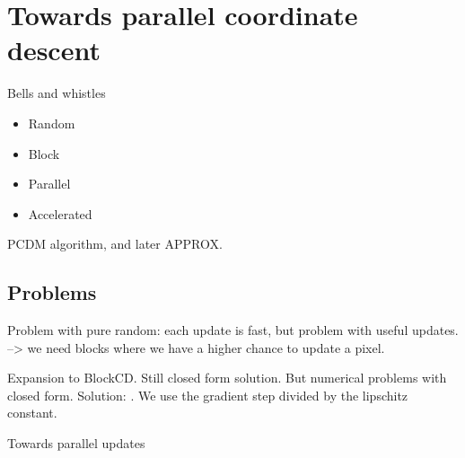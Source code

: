 \section{Towards parallel coordinate descent}

Bells and whistles

\begin{itemize}
	\item Random
	\item Block
	\item Parallel
	\item Accelerated
\end{itemize}

PCDM algorithm, and later APPROX.

\subsection{Problems}
Problem with pure random: each update is fast, but problem with useful updates. --> we need blocks where we have a higher chance to update a pixel.

Expansion to BlockCD. Still closed form solution. But numerical problems with closed form. Solution: \cite{richtarik2014iteration}. We use the gradient step divided by the lipschitz constant.

Towards parallel updates


